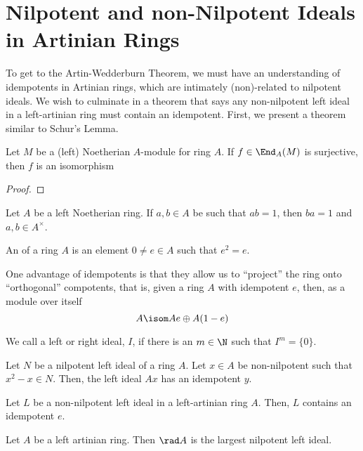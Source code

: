 \documentclass[11pt,leqno,oneside]{amsbook}
\numberwithin{thm}{section}
\begin{document}
\section{Nilpotent and non-Nilpotent Ideals in Artinian Rings}
To get to the Artin-Wedderburn Theorem, we must have an understanding
of idempotents in Artinian rings, which are intimately (non)-related to
nilpotent ideals. We wish to culminate in a theorem that says any
non-nilpotent left ideal in a left-artinian ring must contain an
idempotent. First, we present a theorem similar to Schur's Lemma.
\begin{thm}
  Let \(M\) be a (left) Noetherian \(A\)-module for ring \(A\). If \(f
  \in \End_A(M)\) is surjective, then \(f\) is an isomorphism
\end{thm}
\begin{proof}
  
\end{proof}
\begin{thm}
  Let \(A\) be a left Noetherian ring. If \(a,b \in A\) be such that \(ab =
  1\), then \(ba = 1\) and \(a,b \in A^\times\).
\end{thm}
\begin{defn}
  An  of a ring \(A\) is an element \(0 \neq e \in A\)
  such that \(e^2 = e\).
\end{defn}
One advantage of idempotents is that they allow us to ``project'' the
ring onto ``orthogonal'' compotents, that is, given a ring \(A\) with
idempotent \(e\), then, as a module over itself \[
  A \isom Ae \oplus A(1-e)
\]
\begin{defn}
  We call a left or right ideal, \(I\),  if there is an \(m
  \in \N\) such that \(I^m = \{0\}\).
\end{defn}
\begin{thm}
  Let \(N\) be a nilpotent left ideal of a ring \(A\). Let \(x \in A\)
  be non-nilpotent such that \(x^2-x \in N\). Then, the left ideal
  \(Ax\) has an idempotent \(y\).
\end{thm}
\begin{thm}
  Let \(L\) be a non-nilpotent left ideal in a left-artinian ring
  \(A\). Then, \(L\) contains an idempotent \(e\).
\end{thm}
\begin{thm}
  Let \(A\) be a left artinian ring. Then \(\rad A\) is the largest
  nilpotent left ideal.
\end{thm}
\end{document}
